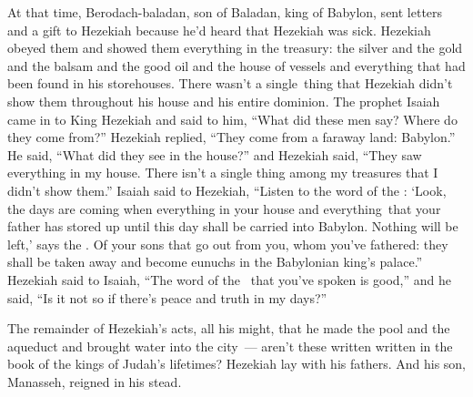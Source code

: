\begin{inparaenum}
   At that time, Berodach-baladan, son of Baladan, king of Babylon, sent letters and a gift to Hezekiah because he'd heard that Hezekiah was sick.%
   Hezekiah obeyed them and showed them everything in the treasury: the silver and the gold and the balsam and the good oil and the house of vessels and everything that had been found in his storehouses. There wasn't a single\understood\ thing that Hezekiah didn't show them throughout his house and his entire dominion.%
   The prophet Isaiah came in to King Hezekiah and said to him, ``What did these men say? Where do they come from?'' Hezekiah replied, ``They come from a faraway land: Babylon.''%
   He said, ``What did they see in the house?'' and Hezekiah said, ``They saw everything in my house. There isn't a single thing among my treasures that I didn't show them.''%
   Isaiah said to Hezekiah, ``Listen to the word of the \lord:%
   `Look, the days are coming when everything in your house and everything\understood\ that your father has stored up until this day shall be carried into Babylon. Nothing will be left,' says the \lord.%
   Of your sons that go out from you, whom you've fathered: they shall be taken away and become eunuchs in the Babylonian king's palace.''%
   Hezekiah said to Isaiah, ``The word of the \lord\ that you've spoken is good,'' and he said, ``Is it not so if there's peace and truth in my days?''%
  
   The remainder of Hezekiah's acts, all his might, that he made the pool and the aqueduct and brought water into the city~--- aren't these written written in the book of the kings of Judah's lifetimes?%
   Hezekiah lay with his fathers. And his son, Manasseh, reigned in his stead.%
\end{inparaenum}
